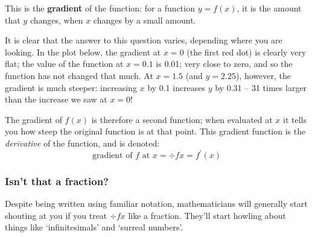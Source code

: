 \documentclass[a4paper,openany,11pt]{book}
\begin{document}
				This is the \textbf{gradient} of the function: for a function $y = f(x)$, it is the amount that $y$ changes, when $x$ changes by a small amount. 

				It is clear that the answer to this question varies, depending where you are looking. In the plot below, the gradient at $x = 0$ (the first red dot) is clearly very flat; the value of the function at $x = 0.1$ is 0.01; very close to zero, and so the function has not changed that much. At $x = 1.5$ (and $y = 2.25$), however, the gradient is much steeper: increasing $x$ by 0.1 increases $y$ by 0.31 -- 31 times larger than the increase we saw at $x = 0$!

				\begin{center}
					\end{center}

				The gradient of $f(x)$ is therefore a second function; when evaluated at $x$ it tells you how steep the original function is at that point. This gradient function is the \textit{derivative} of the function, and is denoted:
				\begin{equation}
					\text{gradient of $f$ at }x = \div{f}{x} = f^\prime(x)
				\end{equation}

				\subsubsection{Isn't that a fraction?}
				Despite being written using familiar notation, mathematicians will generally start shouting at you if you treat $\div{f}{x}$ like a fraction. They'll start howling about things like `infinitesimals' and `surreal numbers'.
				
\end{document}
